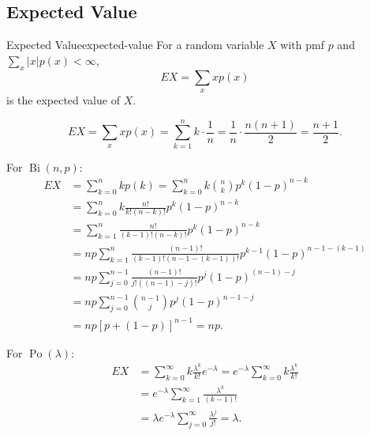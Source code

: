 \subsection{Expected Value}

\begin{definition}{Expected Value}{expected-value}
  For a random variable $X$ with pmf $p$ and $\sum_x|x|p(x)<\infty$,
  \[
    EX=\sum_x xp(x)
  \]
  is the expected value of $X$.
\end{definition}

\begin{example}[Uniform]
  \[
    EX=\sum_x xp(x)=\sum_{k=1}^n k\cdot\frac1n
    =\frac1n\cdot\frac{n(n+1)}2=\frac{n+1}2.
  \]
\end{example}

\begin{example}[Binomial]
  For $\operatorname{Bi}(n,p)$:
  \begin{align*}
    EX & =\sum_{k=0}^n kp(k)=\sum_{k=0}^n k\binom nk p^k(1-p)^{n-k}       \\
       & =\sum_{k=0}^n k\frac{n!}{k!(n-k)!}p^k(1-p)^{n-k}                 \\
       & =\sum_{k=1}^n\frac{n!}{(k-1)!(n-k)!}p^k(1-p)^{n-k}               \\
       & =np\sum_{k=1}^n\frac{(n-1)!}{(k-1)!(n-1-(k-1))!}
    p^{k-1}(1-p)^{n-1-(k-1)}                                              \\
       & =np\sum_{j=0}^{n-1}\frac{(n-1)!}{j!((n-1)-j)!}p^j(1-p)^{(n-1)-j} \\
       & =np\sum_{j=0}^{n-1}\binom{n-1}{j}p^j(1-p)^{n-1-j}                \\
       & =np[p+(1-p)]^{n-1}=np.
  \end{align*}
\end{example}

\begin{example}[Poisson]
  For $\operatorname{Po}(\lambda)$:
  \begin{align*}
    EX & =\sum_{k=0}^{\infty}k\frac{\lambda^k}{k!}e^{-\lambda}
    =e^{-\lambda}\sum_{k=0}^{\infty}k\frac{\lambda^k}{k!}                      \\
       & =e^{-\lambda}\sum_{k=1}^{\infty}\frac{\lambda^k}{(k-1)!}              \\
       & =\lambda e^{-\lambda}\sum_{j=0}^{\infty}\frac{\lambda^j}{j!}=\lambda.
  \end{align*}
\end{example}

